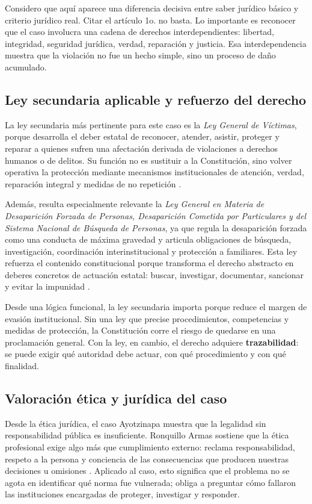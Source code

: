\documentclass[
	spanish,
	letterpaper, oneside
]{article}
\begin{document}
Considero que aquí aparece una diferencia decisiva entre saber jurídico básico y criterio jurídico real. Citar el artículo 1o. no basta. Lo importante es reconocer que el caso involucra una cadena de derechos interdependientes: libertad, integridad, seguridad jurídica, verdad, reparación y justicia. Esa interdependencia muestra que la violación no fue un hecho simple, sino un proceso de daño acumulado.

\subsection{Ley secundaria aplicable y refuerzo del derecho}

La ley secundaria más pertinente para este caso es la \textit{Ley General de Víctimas}, porque desarrolla el deber estatal de reconocer, atender, asistir, proteger y reparar a quienes sufren una afectación derivada de violaciones a derechos humanos o de delitos. Su función no es sustituir a la Constitución, sino volver operativa la protección mediante mecanismos institucionales de atención, verdad, reparación integral y medidas de no repetición \citep{lgv2026}.

Además, resulta especialmente relevante la \textit{Ley General en Materia de Desaparición Forzada de Personas, Desaparición Cometida por Particulares y del Sistema Nacional de Búsqueda de Personas}, ya que regula la desaparición forzada como una conducta de máxima gravedad y articula obligaciones de búsqueda, investigación, coordinación interinstitucional y protección a familiares. Esta ley refuerza el contenido constitucional porque transforma el derecho abstracto en deberes concretos de actuación estatal: buscar, investigar, documentar, sancionar y evitar la impunidad \citep{lgmdfp2026}.

Desde una lógica funcional, la ley secundaria importa porque reduce el margen de evasión institucional. Sin una ley que precise procedimientos, competencias y medidas de protección, la Constitución corre el riesgo de quedarse en una proclamación general. Con la ley, en cambio, el derecho adquiere \textbf{trazabilidad}: se puede exigir qué autoridad debe actuar, con qué procedimiento y con qué finalidad.

\subsection{Valoración ética y jurídica del caso}

Desde la ética jurídica, el caso Ayotzinapa muestra que la legalidad sin responsabilidad pública es insuficiente. Ronquillo Armas sostiene que la ética profesional exige algo más que cumplimiento externo: reclama responsabilidad, respeto a la persona y conciencia de las consecuencias que producen nuestras decisiones u omisiones \citep{ronquilloarmasEticaGeneralProfesional2018}. Aplicado al caso, esto significa que el problema no se agota en identificar qué norma fue vulnerada; obliga a preguntar cómo fallaron las instituciones encargadas de proteger, investigar y responder.
\end{document}
